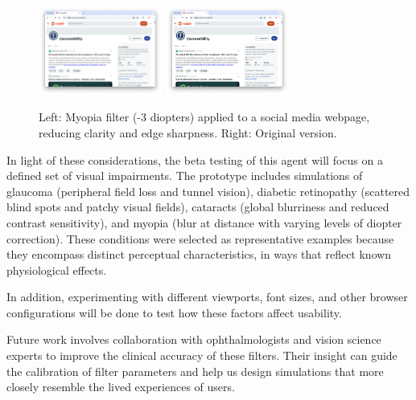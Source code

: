 \begin{figure}
    \centering
    \includegraphics[width=115pt]{imgs/myopia-filter.png}
    \includegraphics[width=115pt]{imgs/no-myopia-filter.png}
    \caption{Left: Myopia filter (-3 diopters) applied to a social media webpage, reducing clarity and edge sharpness. Right: Original version.}
    \vspace{-13pt}
    \label{fig:myopia-filters}
\end{figure}


In light of these considerations, the beta testing of this agent will focus on a defined set of visual impairments. The prototype includes simulations of glaucoma (peripheral field loss and tunnel vision\cite{Cassel2021EyeBook}), diabetic retinopathy (scattered blind spots and patchy visual fields\cite{Cassel2021EyeBook}), cataracts (global blurriness and reduced contrast sensitivity\cite{Cassel2021EyeBook}), and myopia (blur at distance with varying levels of diopter correction\cite{Cassel2021EyeBook}). These conditions were selected as representative examples because they encompass distinct perceptual characteristics, in ways that reflect known physiological effects.

In addition, experimenting with different viewports, font sizes, and other browser configurations\cite{chiou2024automatically} will be done to test how these factors affect usability.

Future work involves collaboration with ophthalmologists and vision science experts to improve the clinical accuracy of these filters. Their insight can guide the calibration of filter parameters and help us design simulations that more closely resemble the lived experiences of users.

